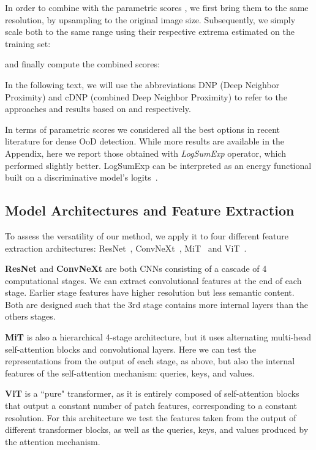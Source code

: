 \documentclass[10pt,twocolumn,letterpaper]{article}
\begin{document}
In order to combine  with the parametric scores , we first bring them to the same resolution, by upsampling  to the original image size.
Subsequently, we simply scale both to the same range using their respective extrema estimated on the training set:

and finally compute the combined scores:


In the following text, we will use the abbreviations DNP (Deep Neighbor Proximity) and cDNP (combined Deep Neighbor Proximity) to refer to the approaches and results based on  and  respectively.

In terms of parametric scores we considered all the best options in recent literature for dense OoD detection. While more results are available in the Appendix, here we report those obtained with \textit{LogSumExp} operator, which performed slightly better. LogSumExp can be interpreted as an energy functional built on a discriminative model's logits~\cite{Grathwohl2020Your,Tian2021}.

\subsection{Model Architectures and Feature Extraction}
\label{sec:archs}
To assess the versatility of our method, we apply it to four different feature extraction architectures: ResNet~\cite{he2016deep}, ConvNeXt~\cite{liu2022convnet}, MiT~\cite{xie2021segformer} and ViT~\cite{dosovitskiy2020image}.

\textbf{ResNet} and \textbf{ConvNeXt} are both CNNs consisting of a cascade of 4 computational stages. We can extract convolutional features at the end of each stage. Earlier stage features have higher resolution but less semantic content. Both are designed such that the 3rd stage contains more internal layers than the others stages.

\textbf{MiT} is also a hierarchical 4-stage architecture, but it uses alternating multi-head self-attention blocks and convolutional layers. Here we can test the representations from the output of each stage, as above, but also the internal features of the self-attention mechanism: queries, keys, and values.

\textbf{ViT} is a ``pure" transformer, as it is entirely composed of self-attention blocks that output a constant number of patch features, corresponding to a constant resolution. For this architecture we test the features taken from the output of different transformer blocks, as well as the queries, keys, and values produced by the attention mechanism.
\end{document}
